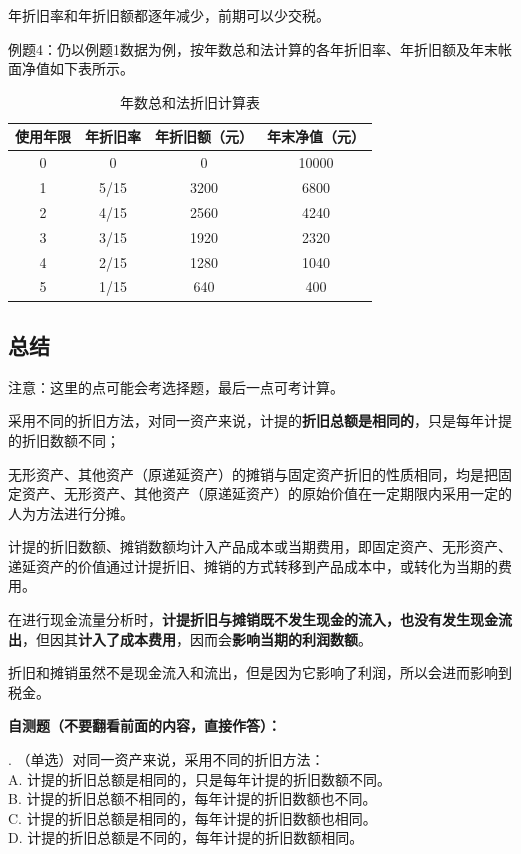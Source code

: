 年折旧率和年折旧额都逐年减少，前期可以少交税。

例题4：仍以例题1数据为例，按年数总和法计算的各年折旧率、年折旧额及年末帐面净值如下表所示。
\begin{table}[H]
\centering
\caption{年数总和法折旧计算表}
\begin{tabular}{cccc}
\toprule
使用年限 & 年折旧率 & 年折旧额（元） & 年末净值（元） \\
\midrule
0 & 0 & 0 & 10000 \\
1 & 5/15 & 3200 & 6800 \\
2 & 4/15 & 2560 & 4240 \\
3 & 3/15 & 1920 & 2320 \\
4 & 2/15 & 1280 & 1040 \\
5 & 1/15 & 640 & 400 \\
\bottomrule
\end{tabular}
\end{table}

\subsection{总结}
注意：这里的点可能会考选择题，最后一点可考计算。

采用不同的折旧方法，对同一资产来说，计提的\textbf{折旧总额是相同的}，只是每年计提的折旧数额不同；

无形资产、其他资产（原递延资产）的摊销与固定资产折旧的性质相同，均是把固定资产、无形资产、其他资产（原递延资产）的原始价值在一定期限内采用一定的人为方法进行分摊。

计提的折旧数额、摊销数额均计入产品成本或当期费用，即固定资产、无形资产、递延资产的价值通过计提折旧、摊销的方式转移到产品成本中，或转化为当期的费用。

在进行现金流量分析时，\textbf{计提折旧与摊销既不发生现金的流入，也没有发生现金流出}，但因其\textbf{计入了成本费用}，因而会\textbf{影响当期的利润数额}。

折旧和摊销虽然不是现金流入和流出，但是因为它影响了利润，所以会进而影响到税金。

\noindent \textbf{自测题（不要翻看前面的内容，直接作答）：}

. （单选）对同一资产来说，采用不同的折旧方法：\\
A. 计提的折旧总额是相同的，只是每年计提的折旧数额不同。\\
B. 计提的折旧总额不相同的，每年计提的折旧数额也不同。\\
C. 计提的折旧总额是相同的，每年计提的折旧数额也相同。\\
D. 计提的折旧总额是不同的，每年计提的折旧数额相同。

